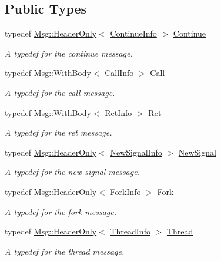 \subsection*{Public Types}
\begin{DoxyCompactItemize}
\item 
typedef \hyperlink{class_message_1_1_msg_a56cc5b2c5d898b85e97b1f3a46ab3999}{Msg\+::\+Header\+Only}$<$ \hyperlink{struct_message_1_1_continue_info}{Continue\+Info} $>$ \hyperlink{class_message_a3575d142bf847cc5a7aecd718434fe4f}{Continue}
\begin{DoxyCompactList}\small\item\em A typedef for the continue message. \end{DoxyCompactList}\item 
typedef \hyperlink{class_message_1_1_msg_a385691f2f7fc10f0b4c1544b8892a6c9}{Msg\+::\+With\+Body}$<$ \hyperlink{struct_message_1_1_call_info}{Call\+Info} $>$ \hyperlink{class_message_a65eabf9d1dcd603d2e7c14c5274a5bdb}{Call}
\begin{DoxyCompactList}\small\item\em A typedef for the call message. \end{DoxyCompactList}\item 
typedef \hyperlink{class_message_1_1_msg_a385691f2f7fc10f0b4c1544b8892a6c9}{Msg\+::\+With\+Body}$<$ \hyperlink{struct_message_1_1_ret_info}{Ret\+Info} $>$ \hyperlink{class_message_a40df5862ba4d83b310c203e0873c15eb}{Ret}
\begin{DoxyCompactList}\small\item\em A typedef for the ret message. \end{DoxyCompactList}\item 
typedef \hyperlink{class_message_1_1_msg_a56cc5b2c5d898b85e97b1f3a46ab3999}{Msg\+::\+Header\+Only}$<$ \hyperlink{struct_message_1_1_new_signal_info}{New\+Signal\+Info} $>$ \hyperlink{class_message_a1eb217095ab4b8fede7aed3c9fb0787c}{New\+Signal}
\begin{DoxyCompactList}\small\item\em A typedef for the new signal message. \end{DoxyCompactList}\item 
typedef \hyperlink{class_message_1_1_msg_a56cc5b2c5d898b85e97b1f3a46ab3999}{Msg\+::\+Header\+Only}$<$ \hyperlink{struct_message_1_1_fork_info}{Fork\+Info} $>$ \hyperlink{class_message_af7272b7d937a8248ca0fe6148044e9dc}{Fork}
\begin{DoxyCompactList}\small\item\em A typedef for the fork message. \end{DoxyCompactList}\item 
typedef \hyperlink{class_message_1_1_msg_a56cc5b2c5d898b85e97b1f3a46ab3999}{Msg\+::\+Header\+Only}$<$ \hyperlink{struct_message_1_1_thread_info}{Thread\+Info} $>$ \hyperlink{class_message_ab425362459d8d4440f14d6e02e8c6566}{Thread}
\begin{DoxyCompactList}\small\item\em A typedef for the thread message. \end{DoxyCompactList}\end{DoxyCompactItemize}
